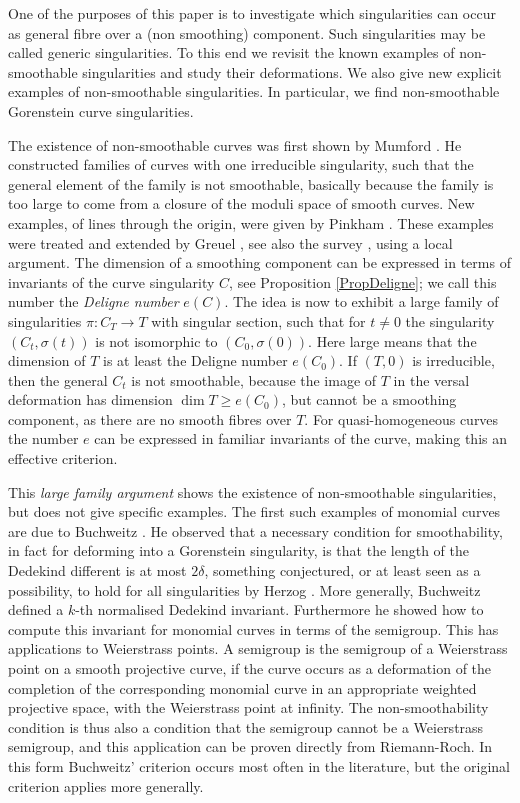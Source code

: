 \documentclass{amsart}
\theoremstyle{definition}
\theoremstyle{remark}
\begin{document}
One of the purposes of this paper is to investigate which singularities can occur as
general fibre over a (non smoothing) component. Such singularities may be called
generic singularities. To this end we revisit the known examples of non-smoothable
singularities and study their deformations. We also give new explicit examples
of non-smoothable singularities. In particular, we find non-smoothable
Gorenstein curve singularities.

The existence of non-smoothable curves was first shown by Mumford \cite{Mu}. 
He constructed families of curves with one irreducible singularity, 
such that the general element of the family is not
smoothable, basically because the family is too large to come from a closure
of  the moduli space of smooth curves. New examples, of lines through the origin, were
given by Pinkham \cite{Pi}.  These examples were treated and extended  by Greuel \cite{Gr0, Gr}, 
see also the survey \cite{Gr2}, using a local argument. The dimension of  a 
smoothing component can be expressed in terms of invariants of the curve singularity $C$,
see Proposition \ref{PropDeligne}; we call this number the \textit{Deligne number} $e(C)$. The idea is now to exhibit a large family
of singularities $\pi \colon C_T \to T$ with singular section,  such that for $t\neq0$
the singularity $(C_t,\sigma(t))$ is not isomorphic to $(C_0,\sigma(0))$. Here large means
that the dimension of $T$ is at least the Deligne number $e(C_0)$. If $(T,0)$ is irreducible, 
then the general $C_t$ is not smoothable, because the image of $T$ in the versal deformation has dimension $\dim T \geq e(C_0)$, but cannot be a smoothing component, as there are no smooth fibres over $T$.
For quasi-homogeneous curves the number $e$ can be expressed in familiar
invariants of the curve, making this an effective criterion.

This \textit{large  family argument} shows the existence of non-smoothable singularities, but does not 
give specific examples. The first such examples of monomial curves are due to Buchweitz \cite{Bu}.
He observed that a necessary condition for smoothability, in fact for deforming into
a Gorenstein singularity, is that the length of the Dedekind different is at most $2\delta$, something
conjectured,  or at least seen as a possibility,  to hold for all singularities by Herzog \cite{He}.
More generally, Buchweitz defined a $k$-th normalised Dedekind invariant. Furthermore he showed 
how to compute this invariant for monomial curves in terms of the semigroup. 
This has applications to Weierstrass points. A semigroup is the semigroup of
a Weierstrass point on a smooth projective curve, if the curve occurs as a deformation
of the completion of the corresponding monomial curve in an appropriate weighted
projective space, with the Weierstrass point at infinity. The non-smoothability
condition is thus also a condition that the semigroup cannot be a
Weierstrass semigroup, and this application can be proven directly from Riemann-Roch. 
In this form
Buchweitz' criterion occurs most often in the literature, but the original criterion
applies more generally.
\end{document}
